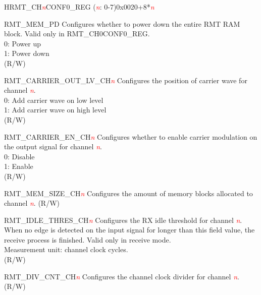\begin{register}{H}{RMT\_CH\textcolor{red}{\it{n}}CONF0\_REG (\textcolor{red}{\it{n}}: 0-7)}{0x0020+8*\textcolor{red}{\it{n}}}\label{regdesc:RMTCHnCONF0REG}
%
%
%
%
%
%
%
\regnewline%
\begin{regdesc}\begin{reglist}
\item [RMT\_MEM\_PD] Configures whether to power down the entire RMT RAM block. Valid only in RMT\_CH0CONF0\_REG.\\
0: Power up\\
1: Power down\\ (R/W)
\item [RMT\_CARRIER\_OUT\_LV\_CH\textcolor{red}{\it{n}}] Configures the position of carrier wave for channel \textcolor{red}{\it{n}}.\\
0: Add carrier wave on low level\\
1: Add carrier wave on high level\\ (R/W)
\item [RMT\_CARRIER\_EN\_CH\textcolor{red}{\it{n}}] Configures whether to enable carrier modulation on the output signal for channel \textcolor{red}{\it{n}}.\\
0: Disable\\
1: Enable\\ (R/W)
\item [RMT\_MEM\_SIZE\_CH\textcolor{red}{\it{n}}] Configures the amount of memory blocks allocated to channel \textcolor{red}{\it{n}}. (R/W)
\item [RMT\_IDLE\_THRES\_CH\textcolor{red}{\it{n}}] Configures the RX idle threshold for channel \textcolor{red}{\it{n}}. When no edge is detected on the input signal for longer than this field value, the receive process is finished. Valid only in receive mode.\\
Measurement unit: channel clock cycles.\\ (R/W)
\item [RMT\_DIV\_CNT\_CH\textcolor{red}{\it{n}}] Configures the channel clock divider for channel \textcolor{red}{\it{n}}. (R/W)
\end{reglist}\end{regdesc}
\end{register}


